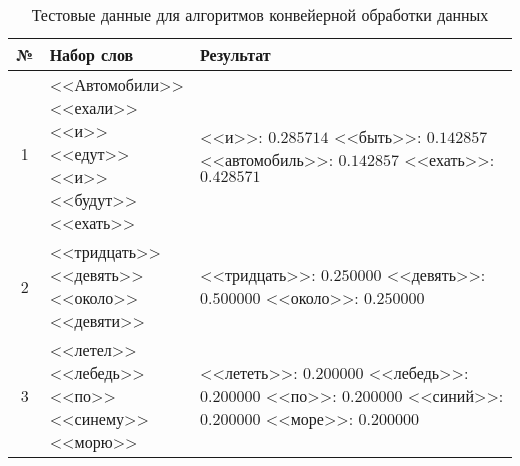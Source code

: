 \begin{table}[H]
  \caption{\label{table:tests} Тестовые данные для алгоритмов конвейерной обработки данных}
  \begin{center}
    \begin{tabular}{|c|l|l|}
      \hline
      № & Набор слов & Результат \\ \hline
      1 
      & 
      \makecell{
      <<Автомобили>> \\
	  <<ехали>> \\
	  <<и>> \\
	  <<едут>> \\
	  <<и>> \\
	  <<будут>> \\
	  <<ехать>> \\
      }
      &
      \makecell{
      <<и>>: $0.285714$ \\
        <<быть>>: $0.142857$ \\
        <<автомобиль>>: $0.142857$ \\
        <<ехать>>: $0.428571$
      }
      \\ \hline
      
      
      2
      & 
      \makecell{
      <<тридцать>> \\
	  <<девять>> \\
	  <<около>> \\
	  <<девяти>> 
      }
      &
      \makecell{
      <<тридцать>>: $0.250000$ \\
        <<девять>>: $0.500000$ \\
        <<около>>: $0.250000$
      }
      \\ \hline
      
      3
      & 
      \makecell{
      <<летел>> \\
	  <<лебедь>> \\
	  <<по>> \\
	  <<синему>> \\
	  <<морю>>
      }
      &
      \makecell{
      <<лететь>>: $0.200000$ \\
        <<лебедь>>: $0.200000$ \\
        <<по>>: $0.200000$ \\
        <<синий>>: $0.200000$ \\
        <<море>>: $0.200000$ \\
      }
      \\ \hline
    \end{tabular}
  \end{center}
\end{table}

\newpage